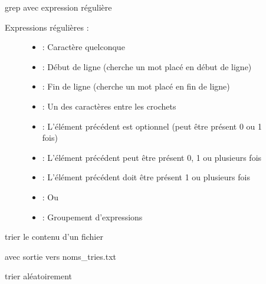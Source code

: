 \documentclass[letterpaper,10pt,french]{sphinxmanual}
\begin{document}
\begin{description}
\item[{}] \leavevmode
grep avec expression régulière
\begin{description}
\item[{Expressions régulières :}] \leavevmode\begin{itemize}
\item {} 
 : Caractère quelconque

\item {} 
\sphinxcode{\sphinxupquote{\textasciicircum{}}} : Début de ligne (cherche un mot placé en début de ligne)

\item {} 
\sphinxcode{\sphinxupquote{\$}} : Fin de ligne (cherche un mot placé en fin de ligne)

\item {} 
\sphinxcode{\sphinxupquote{{[}{]}}} : Un des caractères entre les crochets

\item {} 
 : L’élément précédent est optionnel (peut être présent 0 ou 1 fois)

\item {} 
\sphinxcode{\sphinxupquote{*}} : L’élément précédent peut être présent 0, 1 ou plusieurs fois

\item {} 
\sphinxcode{\sphinxupquote{+}} : L’élément précédent doit être présent 1 ou plusieurs fois

\item {} 
\sphinxcode{\sphinxupquote{\textbar{}}} : Ou

\item {} 
\sphinxcode{\sphinxupquote{()}} : Groupement d’expressions

\end{itemize}

\end{description}

\item[{}] \leavevmode
trier le contenu d’un fichier

\item[{}] \leavevmode
avec sortie vers noms\_tries.txt

\item[{}] \leavevmode
trier aléatoirement


\end{description}
\end{document}
